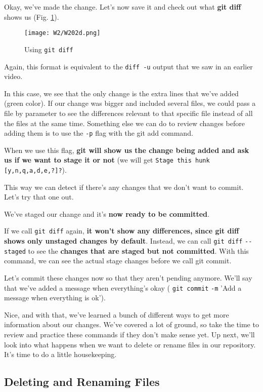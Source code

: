 	Okay, we've made the change. Let's now save it and check out what \textbf{git diff} shows us (Fig. \ref{W202d}).
	
	\begin{figure} 
		\caption{Using \texttt{git diff} }
		\centering
		\texttt{[image: W2/W202d.png]}
		\label{W202d}
	\end{figure}
	
	Again, this format is equivalent to the \verb|diff -u| output that we saw in an earlier video.
	
	In this case, we see that the only change is the extra lines that we've added (green color). If our change was bigger and included several files, we could pass a file by parameter to see the differences relevant to that specific file instead of all the files at the same time. Something else we can do to review changes before adding them is to use the \verb|-p| flag with the git add command.
	
	When we use this flag, \textbf{git will show us the change being added and ask us if we want to stage it or not} (we will get \texttt{Stage this hunk} \verb|[y,n,q,a,d,e,?]?|).
	
	This way we can detect if there's any changes that we don't want to commit. Let's try that one out.
	
	We've staged our change and it's \textbf{now ready to be committed}.
	
	If we call \texttt{git diff} again, \textbf{it won't show any differences, since git diff shows only unstaged changes by default}. Instead, we can call \texttt{git diff} \verb|--staged| to see the \textbf{changes that are staged but not committed}. With this command, we can see the actual stage changes before we call git commit.
	
	Let's commit these changes now so that they aren't pending anymore.	We'll say that we've added a message when everything's okay ( \texttt{git commit} \verb|-m| 'Add a message when everything is ok').
	
	Nice, and with that, we've learned a bunch of different ways to get more information about our changes. We've covered a lot of ground, so take the time to review and practice these commands if they don't make sense yet. Up next, we'll look into what happens when we want to delete or rename files in our repository. It's time to do a little housekeeping.
	
	\subsection{Deleting and Renaming Files}
		
